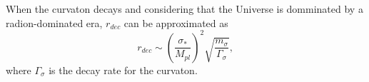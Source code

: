\documentclass[amssymb,twocolumn,prd,nofootinbib,showpacs]{revtex4-1}
\begin{document}
When the curvaton decays and considering that the Universe is domminated by a radion-dominated era, $r_{dec}$ can be approximated as \cite{curv2,curvaton3}
\begin{equation}
r_{dec}\sim \left(\frac{\sigma_*}{M_{pl}}\right)^2\sqrt{\frac{m_\sigma}{\Gamma_{\sigma}}},
\end{equation}
where $\Gamma_\sigma$ is the decay rate for the curvaton.









\end{document}
